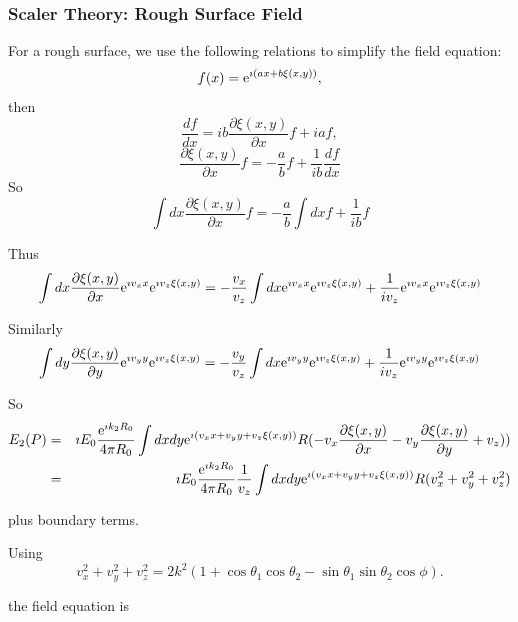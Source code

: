\documentclass[11pt]{article}
\newcommand{\pder}[2]{\frac{\partial {#1}}{\partial {#2}}}
\newcommand{\der}[2]{\frac{d {#1}}{d {#2}}}
\newcommand{\e}{{\rm e}}
\begin{document}
{{{{%
\subsubsection{Scaler Theory: Rough Surface Field}

For a rough surface, we use the following relations to simplify the field equation:
  \begin{equation}
f(x)=\e^{\imath (ax+b\xi(x,y))},
  \end{equation}
then
  \begin{equation}
\der{f}{x}=ib\pder{\xi(x,y)}{x}f+iaf,
  \end{equation}
  \begin{equation}
\pder{\xi(x,y)}{x}f=-\frac{a}{b}f+\frac{1}{ib}\der{f}{x}
  \end{equation}
So
  \begin{equation}
\int dx\pder{\xi(x,y)}{x}f=-\frac{a}{b}\int dx f+\frac{1}{ib}f
  \end{equation}

Thus
  \begin{equation}
\int dx\pder{\xi(x,y)}{x}\e^{\imath v_{x}x}\e^{\imath v_{z}\xi(x,y)}=-\frac{v_{x}}{v_{z}}\int dx \e^{\imath v_{x}x}\e^{\imath v_{z}\xi(x,y)}+\frac{1}{iv_{z}}\e^{\imath v_{x}x}\e^{\imath v_{z}\xi(x,y)}
  \end{equation}

Similarly
  \begin{equation}
\int dy\pder{\xi(x,y)}{y}\e^{\imath v_{y}y}\e^{\imath v_{z}\xi(x,y)}=-\frac{v_{y}}{v_{z}}\int dx \e^{\imath v_{y}y}\e^{\imath v_{z}\xi(x,y)}+\frac{1}{iv_{z}}\e^{\imath v_{y}y}\e^{\imath v_{z}\xi(x,y)}
  \end{equation}

So
\begin{eqnarray}
E_{2}(P)&=&\imath E_{0}\frac{\e^{\imath k_{2}R_{0}}}{4\pi R_{0}}\int dx dy\e^{\imath( v_{x}x+v_{y}y+v_{z}\xi(x,y))}R(-v_{x}\pder{\xi(x,y)}{x}-v_{y}\pder{\xi(x,y)}{y}+v_{z})
)\\
&=&\imath E_{0}\frac{\e^{\imath k_{2}R_{0}}}{4\pi R_{0}}\frac{1}{v_{z}}\int dx dy\e^{\imath( v_{x}x+v_{y}y+v_{z}\xi(x,y))}R(v_{x}^{2}+v_{y}^{2}+v_{z}^{2})
\end{eqnarray}

plus boundary terms.

Using
$$v_{x}^{2}+v_{y}^{2}+v_{z}^{2}=2k^{2}\left(1+\cos\theta_{1}\cos\theta_{2}-\sin\theta_{1}\sin\theta_{2}\cos\phi\right).$$

the field equation is

}}}}
\end{document}
